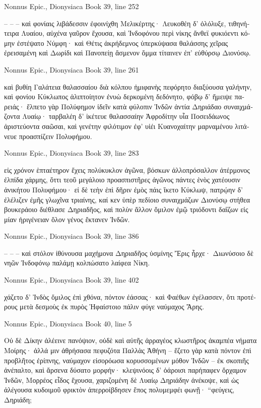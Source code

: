 \documentclass[12pt,letterpaper,twoside,final]{memoir}
\begin{document}
\begin{greek}
Nonnus Epic., Dionysiaca 
Book 39, line 252

        –   –   –  
 καὶ φονίαις λιβάδεσσιν ἐφοινίχθη Μελικέρτης· 
Λευκοθέη δ' ὀλόλυξε, τιθηνήτειρα Λυαίου, 
αὐχένα γαῦρον ἔχουσα, καὶ Ἰνδοφόνου περὶ νίκης 
ἄνθεϊ φυκιόεντι κόμην ἐστέψατο Νύμφη· 
καὶ Θέτις ἀκρήδεμνος ὑπερκύψασα θαλάσσης 
χεῖρας ἐρεισαμένη καὶ Δωρίδι καὶ Πανοπείῃ 
ἄσμενον ὄμμα τίταινεν ἐπ' εὐθύρσῳ Διονύσῳ. 



Nonnus Epic., Dionysiaca 
Book 39, line 261

καὶ βυθίη Γαλάτεια θαλασσαίου διὰ κόλπου 
ἡμιφανὴς πεφόρητο διαξύουσα γαλήνην, 
καὶ φονίου Κύκλωπος ἁλιπτοίητον ἐνυὼ 
δερκομένη δεδόνητο, φόβῳ δ' ἤμειψε παρειάς· 
ἔλπετο γὰρ Πολύφημον ἰδεῖν κατὰ φύλοπιν Ἰνδῶν 
ἀντία Δηριάδαο συναιχμάζοντα Λυαίῳ· 
ταρβαλέη δ' ἱκέτευε θαλασσαίην Ἀφροδίτην 
υἷα Ποσειδάωνος ἀριστεύοντα σαῶσαι, 
καὶ γενέτην φιλότιμον ἐφ' υἱέι Κυανοχαίτην 
μαρναμένου λιτάνευε προασπίζειν Πολυφήμου. 



Nonnus Epic., Dionysiaca 
Book 39, line 283

εἰς χρόνον ἑπταέτηρον ἔχεις πολύκυκλον ἀγῶνα, 
βόσκων ἀλλοπρόσαλλον ἀτέρμονος ἐλπίδα χάρμης, 
ὅττι τεοῦ μεγάλοιο προασπιστῆρες ἀγῶνος 
πάντες ἑνὸς χατέουσιν ἀνικήτου Πολυφήμου· 
εἰ δὲ τεὴν ἐπὶ δῆριν ἐμὸς πάις ἵκετο Κύκλωψ, 
πατρῴην δ' ἐλέλιζεν ἐμῆς γλωχῖνα τριαίνης, 
καί κεν ὑπὲρ πεδίοιο συναιχμάζων Διονύσῳ 
στήθεα βουκεράοιο διέθλασε Δηριαδῆος, 
καὶ πολὺν ἄλλον ὅμιλον ἐμῷ τριόδοντι δαΐζων 
εἰς μίαν ἠριγένειαν ὅλον γένος ἔκτανεν Ἰνδῶν. 



Nonnus Epic., Dionysiaca 
Book 39, line 386

        –   –   –  
 καὶ στόλον ἰθύνουσα μαχήμονα Δηριαδῆος   
ὑσμίνης Ἔρις ἦρχε· Διωνύσοιο δὲ νηῶν 
Ἰνδοφόνῳ παλάμῃ κολπώσατο λαίφεα Νίκη. 



Nonnus Epic., Dionysiaca 
Book 39, line 402

χάζετο δ' Ἰνδὸς ὅμιλος ἐπὶ χθόνα, πόντον ἐάσσας· 
καὶ Φαέθων ἐγέλασσεν, ὅτι προτέρους μετὰ δεσμοὺς 
ἐκ πυρὸς Ἡφαίστοιο πάλιν φύγε ναύμαχος Ἄρης. 



Nonnus Epic., Dionysiaca 
Book 40, line 5

Οὐ δὲ Δίκην ἀλέεινε πανόψιον, οὐδὲ καὶ αὐτῆς 
ἀρραγέος κλωστῆρος ἀκαμπέα νήματα Μοίρης· 
ἀλλά μιν ἀθρήσασα πεφυζότα Παλλὰς Ἀθήνη –  
ἕζετο γὰρ κατὰ πόντον ἐπὶ προβλῆτος ἐρίπνης, 
ναύμαχον εἰσορόωσα κορυσσομένων μόθον Ἰνδῶν –  
ἐκ σκοπιῆς ἀνέπαλτο, καὶ ἄρσενα δύσατο μορφήν· 
κλεψινόοις δ' ὀάροισι παρήπαφεν ὄρχαμον Ἰνδῶν, 
Μορρέος εἶδος ἔχουσα, χαριζομένη δὲ Λυαίῳ 
Δηριάδην ἀνέκοψε, καὶ ὡς ἀλέγουσα κυδοιμοῦ 
φρικτὸν ἀπερροίβδησεν ἔπος πολυμεμφέι φωνῇ· 
 “φεύγεις, Δηριάδη; 




\end{greek}
\end{document}
